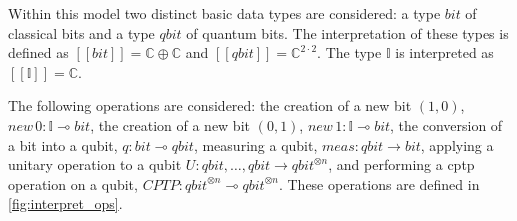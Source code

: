 Within this model two distinct basic data types are considered: a type $\textit{bit}$ of classical bits and a type $\textit{qbit}$ of quantum bits.  The interpretation of these types is defined as  $[\![\textit{bit}]\!]=\mathbb{C}\oplus\mathbb{C}$ and $[\![\textit{qbit}]\!]=\mathbb{C}^{2\cdot 2}$. The type $\mathbb{I}$ is interpreted as $[\![\mathbb{I}]\!]=\mathbb{C}$.


The following operations are considered: the creation of a new bit $(1,0)$, $\textit{new} \hspace{2pt} 0  :\mathbb{I}  \multimap \textit{bit} $, the creation of a new bit $(0,1)$, $\textit{new} \hspace{2pt} 1  :\mathbb{I}  \multimap \textit{bit} $, the conversion of a bit into a qubit, $q : \textit{bit}  \multimap \textit{qbit}$, measuring a qubit, $\textit{meas}:\textit{qbit} \xrightarrow{} \textit{bit}$, applying a unitary  operation to a qubit $\textit{U}:\textit{qbit},\ldots,\textit{qbit} \xrightarrow{} \textit{qbit}^{\otimes n}$, and performing a \acrshort{cptp} operation on a qubit, $\textit{CPTP}: \textit{qbit}^{\otimes n} \multimap \textit{qbit}^{\otimes n}$. These operations are defined in \autoref{fig:interpret_ops}. 


